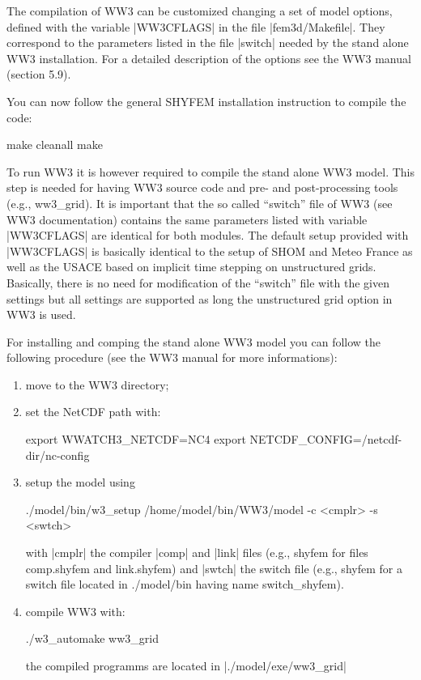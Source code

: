 The compilation of WW3 can be customized changing a set of model options,
defined with the variable |WW3CFLAGS| in the file |fem3d/Makefile|. They
correspond to the parameters listed in the file |switch| needed by the stand 
alone WW3 installation. For a detailed description of the options see the WW3 
manual (section 5.9).

You can now follow the general SHYFEM installation instruction to compile the 
code:
\begin{code}
make cleanall
make
\end{code}
To run WW3 it is however required to compile the stand alone WW3 
model. This step is needed for having WW3 source code and pre- and post-processing 
tools (e.g., ww3\_grid). 
It is important that the so called ``switch'' file of WW3 (see WW3 documentation) 
contains the same parameters listed with variable |WW3CFLAGS| are identical 
for both modules. The default setup provided with |WW3CFLAGS| is basically 
identical to the setup of SHOM and Meteo France as well as the USACE based 
on implicit time stepping on unstructured grids. Basically, there is no need 
for modification of the ``switch'' file with the given settings but all 
settings are supported as long the unstructured grid option in WW3 is used.

For installing and comping the stand alone WW3 model you can follow
the following procedure (see the WW3 manual for more informations):
\begin{enumerate}
\item move to the WW3 directory;
\item set the NetCDF path with:
\begin{code}
export WWATCH3_NETCDF=NC4
export NETCDF_CONFIG=/netcdf-dir/nc-config
\end{code}
\item setup the model using
\begin{code}
./model/bin/w3_setup /home/model/bin/WW3/model -c <cmplr> -s <swtch>
\end{code}
 with |cmplr| the compiler |comp| and |link| files (e.g., shyfem
for files comp.shyfem and link.shyfem) and |swtch| the switch file (e.g., shyfem 
for a switch file located in ./model/bin having name switch\_shyfem).
\item compile WW3 with:
\begin{code}
./w3_automake ww3_grid
\end{code}
the compiled programms are located in |./model/exe/ww3_grid|
\end{enumerate}

